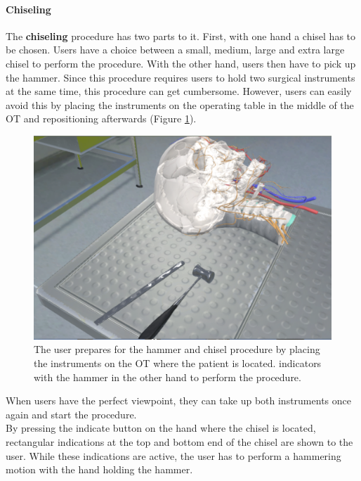 \paragraph{Chiseling}

The \textbf{chiseling} procedure has two parts to it.
First, with one hand a chisel has to be chosen.
Users have a choice between a small, medium, large and extra large chisel to perform the procedure.
With the other hand, users then have to pick up the hammer.
Since this procedure requires users to hold two surgical instruments at the same time, this procedure can get cumbersome.
However, users can easily avoid this by placing the instruments on the operating table in the middle of the OT and repositioning afterwards (Figure \ref{fig::ChiselPrepare}).

\begin{figure}[ht]
    \centering
    \includegraphics[width=\linewidth]{images/implementation/features/procedures/chisel_prepare.png}
    \caption{\label{fig::ChiselPrepare}The user prepares for the hammer and chisel procedure by placing the instruments on the OT where the patient is located.
    indicators with the hammer in the other hand to perform the procedure.}
\end{figure}

When users have the perfect viewpoint, they can take up both instruments once again and start the procedure.
\\ By pressing the indicate button on the hand where the chisel is located, rectangular indications at the top and bottom end of the chisel are shown to the user.
While these indications are active, the user has to perform a hammering motion with the hand holding the hammer.

